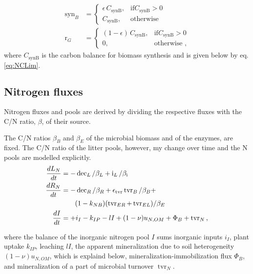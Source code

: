 \begin{subequations}
\label{eq:synB}
\begin{align}
\operatorname{syn}_B &= \begin{cases}
  \epsilon \, C_{\operatorname{synB}},  & \text{if} C_{\operatorname{synB}} >
  0\\
  C_{\operatorname{synB}}, & \text{otherwise}
\end{cases} \\  
\operatorname{r}_G &= \begin{cases}
  (1 - \epsilon) \, C_{\operatorname{synB}},  & \text{if}
  C_{\operatorname{synB}} > 0\\
  0, & \text{otherwise ,}
\end{cases}  
\end{align}
\end{subequations}
where $C_{\operatorname{synB}}$ is the carbon balance for biomass
synthesis and is given below by eq.
\ref{eq:NCLim}.



\subsection{Nitrogen fluxes}
Nitrogen fluxes and pools are derived by dividing the respective fluxes with the
C/N ratio, $\beta$, of their source.

The C/N ratios $\beta_B$ and $\beta_E$ of the microbial biomass and of the
enzymes, are fixed. The C/N ratio of the litter pools, however, my change over time and
the N pools are modelled explicitly.
\begin{subequations}
\label{eq:SEAMN}
\begin{align}
\frac{dL_N}{dt} &=  - \operatorname{dec}_L /\beta_{L} +
\operatorname{i}_L/\beta_{\operatorname{i}} 
\\
\frac{dR_N}{dt} &=  - \operatorname{dec}_R /\beta_{R} +
\epsilon_{\operatorname{tvr}} \operatorname{tvr}_B /\beta_{B} + \notag 
\\
& \qquad (1 -k_{NB}) (\operatorname{tvr}_{ER} +
\operatorname{tvr}_{EL})/\beta_{E} 
\\
\frac{dI}{dt} &= +i_I -k_{IP} -l I +(1-\nu) u_{N,OM} +\Phi_B +
\operatorname{tvr}_N
\text{,} 
\end{align}
\end{subequations}

\noindent where the balance of the inorganic nitrogen pool $I$ sums inorganic
inputs $i_I$, plant uptake $k_{IP}$, leaching $l I$, the apparent mineralization
due to soil heterogeneity $(1 -\nu) u_{N,OM}$, which is explaind below,
mineralization-immobilization flux $\Phi_B$, and mineralization of a part of
microbial turnover $\operatorname{tvr}_N$.

